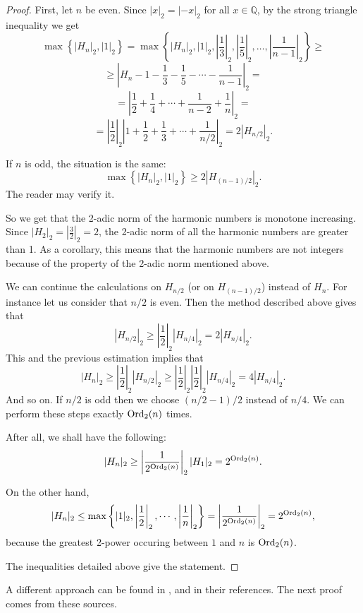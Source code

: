 \documentclass[a4paper,12pt]{amsart}
\begin{document}
\begin{proof}First, let $n$ be even.
Since $|x|_2=|-x|_2$ for all $x\in{\mathbb{Q}}$, by the strong triangle inequality we get
\[\max\left\{|H_n|_2,|1|_2\right\}=\max\left\{|H_n|_2,|1|_2,\left|\frac{1}{3}\right|_2,\left|\frac{1}{5}\right|_2,\dots,\left|\frac{1}{n-1}\right|_2\right\}\ge\]
\[\ge\left|H_n-1-\frac{1}{3}-\frac{1}{5}-\cdots-\frac{1}{n-1}\right|_2=\]
\[=\left|\frac{1}{2}+\frac{1}{4}+\cdots+\frac{1}{n-2}+\frac{1}{n}\right|_2=\]
\[=\left|\frac{1}{2}\right|_2\left|1+\frac{1}{2}+\frac{1}{3}+\cdots+\frac{1}{n/2}\right|_2=2\left|H_{n/2}\right|_2.\]

If $n$ is odd, the situation is the same:
\[\max\left\{|H_n|_2,|1|_2\right\}\ge 2\left|H_{(n-1)/2}\right|_2.\]
The reader may verify it.

So we get that the 2-adic norm of the harmonic numbers is monotone increasing. Since $|H_2|_2=\left|\frac{3}{2}\right|_2=2$, the 2-adic norm of all the harmonic numbers are greater than 1. As a corollary, this means that the harmonic numbers are not integers because of the property of the 2-adic norm mentioned above.

We can continue the calculations on $H_{n/2}$ (or on $H_{(n-1)/2}$) instead of $H_n$. For instance let us consider that $n/2$ is even. Then the method described above gives that
\[|H_{n/2}|_2\ge\left|\frac{1}{2}\right|_2|H_{n/4}|_2=2|H_{n/4}|_2.\]
This and the previous estimation implies that
\[|H_n|_2\ge\left|\frac{1}{2}\right|_2|H_{n/2}|_2\ge\left|\frac{1}{2}\right|_2\left|\frac{1}{2}\right|_2|H_{n/4}|_2=4|H_{n/4}|_2.\]
And so on. If $n/2$ is odd then we choose $(n/2-1)/2$ instead of $n/4$. We can perform these steps exactly ${\mathop{\textup{Ord}}\nolimits}_2(n)$ times.

After all, we shall have the following:
\[|H_n|_2\ge \left|\frac{1}{2^{{\mathop{\textup{Ord}}\nolimits}_2(n)}}\right|_2|H_1|_2=2^{{\mathop{\textup{Ord}}\nolimits}_2(n)}.\]

On the other hand,
\[|H_n|_2\le\max\left\{|1|_2,\left|\frac{1}{2}\right|_2,\cdots,\left|\frac{1}{n}\right|_2\right\}=\left|\frac{1}{2^{{\mathop{\textup{Ord}}\nolimits}_2(n)}}\right|_2=2^{{\mathop{\textup{Ord}}\nolimits}_2(n)},\]
because the greatest 2-power occuring between $1$ and $n$ is ${\mathop{\textup{Ord}}\nolimits}_2(n)$.

The inequalities detailed above give the statement.
\end{proof} 

A different approach can be found in \cite{GKP}, \cite{BR} and in their references. The next proof comes from these sources.
\end{document}
